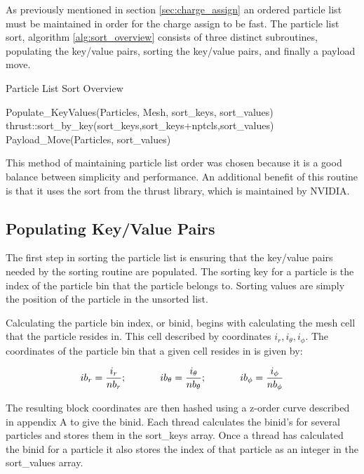 	As previously mentioned in section \ref{sec:charge_assign} an ordered particle list must be maintained in order for the charge assign to be fast. The particle list sort, algorithm \ref{alg:sort_overview} consists of three distinct subroutines, populating the key/value pairs, sorting the key/value pairs, and finally a payload move. 

\begin{algorithm}
	\caption{Particle List Sort Overview}
	\label{alg:sort_overview}
	\begin{algorithmic}
		\STATE
		\STATE Populate\_KeyValues(Particles, Mesh, sort\_keys, sort\_values)
		\STATE
		\STATE thrust::sort\_by\_key(sort\_keys,sort\_keys+nptcls,sort\_values)
		\STATE
		\STATE Payload\_Move(Particles, sort\_values)
	\end{algorithmic}
\end{algorithm}

This method of maintaining particle list order was chosen because it is a good balance between simplicity and performance. An additional benefit of this routine is that it uses the sort from the thrust library, which is maintained by NVIDIA. 

		\subsection{Populating Key/Value Pairs}
The first step in sorting the particle list is ensuring that the key/value pairs needed by the sorting routine are populated. The sorting key for a particle is the index of the particle bin that the particle belongs to. Sorting values are simply the position of the particle in the unsorted list. 

Calculating the particle bin index, or binid, begins with calculating the mesh cell that the particle resides in. This cell described by coordinates $i_r, i_{\theta}, i_{\phi}$. The coordinates of the particle bin that a given cell resides in is given by:

\begin{equation}
ib_r = \frac{i_r}{nb_r} \mathrm{;}\hspace{0.5in} ib_{\theta} = \frac{i_{\theta}}{nb_{\theta}} \mathrm{;} \hspace{0.5in} ib_{\phi} = \frac{i_{\phi}}{nb_{\phi}}
\end{equation}

	The resulting block coordinates are then hashed using a z-order curve described in appendix A to give the binid. Each thread calculates the binid's for several particles and stores them in the sort\_keys array. Once a thread has calculated the binid for a particle it also stores the index of that particle as an integer in the sort\_values array. 

